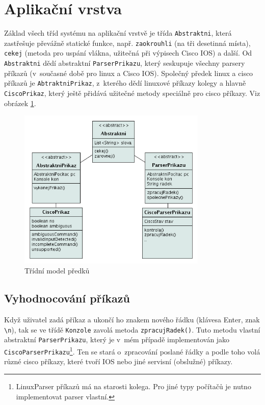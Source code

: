 
\section{Aplikační vrstva}
Základ všech tříd systému na aplikační vrstvě je třída \verb|Abstraktni|, která zastřešuje převážně statické funkce, např. \verb|zaokrouhli| (na tři desetinná místa), \verb|cekej| (metoda pro uspání vlákna, užitečná při výpisech Cisco IOS) a další. Od \verb|Abstraktni| dědí abstraktní \verb|ParserPrikazu|, který seskupuje všechny parsery příkazů (v~současné době pro linux a Cisco IOS). Společný předek linux a cisco příkazů je \verb|AbtraktniPrikaz|, z~kterého dědí linuxové příkazy kolegy a hlavně \verb|CiscoPrikaz|, který ještě přidává užitečné metody speciálně pro cisco příkazy. Viz obrázek \ref{uml:abstraktni}.

\begin{figure}[h]
\begin{center}
\includegraphics[width=9cm]{figures/uml_abtraktni.png}
\caption{Třídní model předků}
\label{uml:abstraktni}
\end{center}
\end{figure}

\subsection{Vyhodnocování příkazů}
Když uživatel zadá příkaz a ukončí ho znakem nového řádku (klávesa Enter, znak \verb|\n|), tak se ve třídě \verb|Konzole| zavolá metoda \verb|zpracujRadek()|. Tuto metodu vlastní abstraktní \verb|ParserPrikazu|, který je v~mém případě implementován jako \verb|CiscoParserPrikazu|\footnote{LinuxParser příkazů má na starosti kolega. Pro jiné typy počítačů je nutno implementovat parser vlastní.}. Ten se stará o~zpracování poslané řádky a podle toho volá různé cisco příkazy, které tvoří IOS nebo jiné servisní (obslužné) příkazy.

